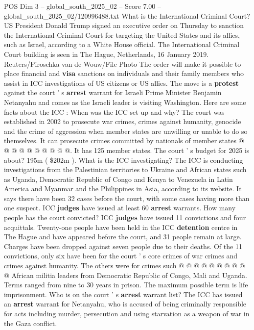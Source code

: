 \begin{textsample}{POS Dim 3 – global\_south\_2025\_02 – Score 7.00 – global\_south\_2025\_02/120996488.txt}  \label{ex:f3_pos_412}
What is the International Criminal Court?
US President Donald Trump signed an executive order on Thursday to sanction the International Criminal Court for targeting the United States and its allies, such as Israel, according to a White House official.
The International Criminal Court building is seen in The Hague, Netherlands, 16 January 2019.
Reuters/Piroschka van de Wouw/File Photo The order will make it possible to place financial and \textbf{visa} sanctions on individuals and their family members who assist in ICC investigations of US citizens or US allies.
The move is a \textbf{protest} against the court ' s \textbf{arrest} warrant for Israeli Prime Minister Benjamin Netanyahu and comes as the Israeli leader is visiting Washington.
Here are some facts about the ICC : When was the ICC set up and why?
The court was established in 2002 to prosecute war crimes, crimes against humanity, genocide and the crime of aggression when member states are unwilling or unable to do so themselves.
It can prosecute crimes committed by nationals of member states @ @ @ @ @ @ @ @ @ @.
It has 125 member states.
The court ' s budget for 2025 is about? 195m ( \$202m ).
What is the ICC investigating?
The ICC is conducting investigations from the Palestinian territories to Ukraine and African states such as Uganda, Democratic Republic of Congo and Kenya to Venezuela in Latin America and Myanmar and the Philippines in Asia, according to its website.
It says there have been 32 cases before the court, with some cases having more than one suspect.
ICC \textbf{judges} have issued at least 60 \textbf{arrest} warrants.
How many people has the court convicted?
ICC \textbf{judges} have issued 11 convictions and four acquittals.
Twenty-one people have been held in the ICC \textbf{detention} centre in The Hague and have appeared before the court, and 31 people remain at large.
Charges have been dropped against seven people due to their deaths.
Of the 11 convictions, only six have been for the court ' s core crimes of war crimes and crimes against humanity.
The others were for crimes such @ @ @ @ @ @ @ @ @ @ African militia leaders from Democratic Republic of Congo, Mali and Uganda.
Terms ranged from nine to 30 years in prison.
The maximum possible term is life imprisonment.
Who is on the court ' s \textbf{arrest} warrant list?
The ICC has issued an \textbf{arrest} warrant for Netanyahu, who is accused of being criminally responsible for acts including murder, persecution and using starvation as a weapon of war in the Gaza conflict.

\end{textsample}
